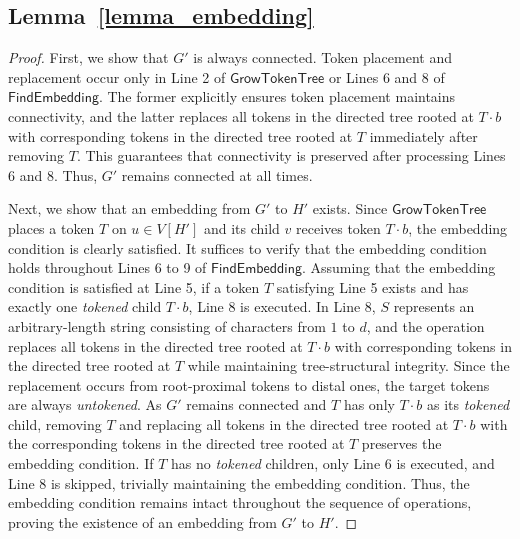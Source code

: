 \documentclass[runningheads]{llncs}
\theoremstyle{plain}
\theoremstyle{definition}
\begin{document}
\subsection{\textbf{Lemma~\ref{lemma_embedding}}}\label{appendix_D3}
\begin{proof}
    First, we show that $G'$ is always connected. Token placement and replacement occur only in Line 2 of $\mathsf{GrowTokenTree}$ or Lines 6 and 8 of $\mathsf{FindEmbedding}$. The former explicitly ensures token placement maintains connectivity, and the latter replaces all tokens in the directed tree rooted at $T \cdot b$ with corresponding tokens in the directed tree rooted at $T$ immediately after removing $T$. This guarantees that connectivity is preserved after processing Lines 6 and 8. Thus, $G'$ remains connected at all times.

    Next, we show that an embedding from $G'$ to $H'$ exists. Since $\mathsf{GrowTokenTree}$ places a token $T$ on $u \in V[H']$ and its child $v$ receives token $T \cdot b$, the embedding condition is clearly satisfied. It suffices to verify that the embedding condition holds throughout Lines 6 to 9 of $\mathsf{FindEmbedding}$. Assuming that the embedding condition is satisfied at Line 5, if a token $T$ satisfying Line 5 exists and has exactly one \textit{tokened} child $T \cdot b$, Line 8 is executed. In Line 8, $S$ represents an arbitrary-length string consisting of characters from $1$ to $d$, and the operation replaces all tokens in the directed tree rooted at $T \cdot b$ with corresponding tokens in the directed tree rooted at $T$ while maintaining tree-structural integrity. Since the replacement occurs from root-proximal tokens to distal ones, the target tokens are always \textit{untokened}. As $G'$ remains connected and $T$ has only $T \cdot b$ as its \textit{tokened} child, removing $T$ and replacing all tokens in the directed tree rooted at $T \cdot b$ with the corresponding tokens in the directed tree rooted at $T$ preserves the embedding condition. If $T$ has no \textit{tokened} children, only Line 6 is executed, and Line 8 is skipped, trivially maintaining the embedding condition. Thus, the embedding condition remains intact throughout the sequence of operations, proving the existence of an embedding from $G'$ to $H'$.
\end{proof}
\end{document}
